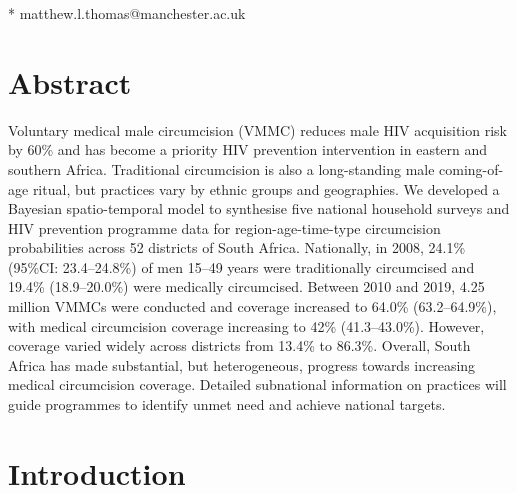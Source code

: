 \documentclass{article}
\begin{document}
* matthew.l.thomas@manchester.ac.uk
\newpage


\section*{Abstract}

Voluntary medical male circumcision (VMMC) reduces male HIV acquisition risk by 60\% and has become a priority HIV prevention intervention in eastern and southern Africa. Traditional circumcision is also a long-standing male coming-of-age ritual, but practices vary by ethnic groups and geographies. We developed a Bayesian spatio-temporal model to synthesise five national household surveys and HIV prevention programme data for region-age-time-type circumcision probabilities across 52 districts of South Africa. Nationally, in 2008, 24.1\% (95\%CI: 23.4--24.8\%) of men 15--49 years were traditionally circumcised and 19.4\% (18.9--20.0\%) were medically circumcised. Between 2010 and 2019, 4.25 million VMMCs were conducted and coverage increased to 64.0\% (63.2--64.9\%), with medical circumcision coverage increasing to 42\% (41.3--43.0\%). However, coverage varied widely across districts from 13.4\% to 86.3\%. Overall, South Africa has made substantial, but heterogeneous, progress towards increasing medical circumcision coverage. Detailed subnational information on practices will guide programmes to identify unmet need and achieve national targets.

\newpage 


\section*{Introduction}

\end{document}

